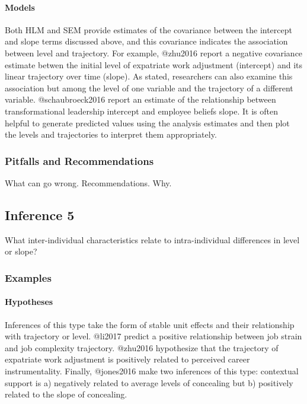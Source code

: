 \documentclass[]{article}
\let\oldparagraph\paragraph
\renewcommand{\paragraph}[1]{\oldparagraph{#1}\mbox{}}
\begin{document}
\hypertarget{models-4}{%
\paragraph{Models}\label{models-4}}

Both HLM and SEM provide estimates of the covariance between the
intercept and slope terms discussed above, and this covariance indicates
the association between level and trajectory. For example, @zhu2016
report a negative covariance estimate betwen the initial level of
expatriate work adjustment (intercept) and its linear trajectory over
time (slope). As stated, researchers can also examine this association
but among the level of one variable and the trajectory of a different
variable. @schaubroeck2016 report an estimate of the relationship
between transformational leadership intercept and employee beliefs
slope. It is often helpful to generate predicted values using the
analysis estimates and then plot the levels and trajectories to
interpret them appropriately.

\hypertarget{pitfalls-and-recommendations-4}{%
\subsubsection{Pitfalls and
Recommendations}\label{pitfalls-and-recommendations-4}}

What can go wrong. Recommendations. Why.

\hypertarget{inference-5}{%
\subsection{Inference 5}\label{inference-5}}

What inter-individual characteristics relate to intra-individual
differences in level or slope?

\hypertarget{examples-5}{%
\subsubsection{Examples}\label{examples-5}}

\hypertarget{hypotheses-5}{%
\paragraph{Hypotheses}\label{hypotheses-5}}

Inferences of this type take the form of stable unit effects and their
relationship with trajectory or level. @li2017 predict a positive
relationship between job strain and job complexity trajectory. @zhu2016
hypothesize that the trajectory of expatriate work adjustment is
positively related to perceived career instrumentality. Finally,
@jones2016 make two inferences of this type: contextual support is a)
negatively related to average levels of concealing but b) positively
related to the slope of concealing.
\end{document}
